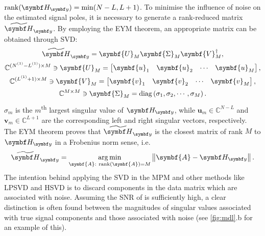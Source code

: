 $\rank(\Hy) = \min(N - L, L + 1)$. To minimise the influence of noise on
the estimated signal poles, it is necessary to
generate a rank-reduced matrix $\Hytilde$. By employing the \ac{EYM}
theorem\cite[Section~2.2]{Golub2013}, an appropriate matrix can be obtained
through \ac{SVD}:%
\begin{subequations}%
    \begin{gather}%
    \Hytilde =
        \symbf{U}_M^{\vphantom{\dagger}}
        \symbf{\Sigma}_M^{\vphantom{\dagger}}
        \symbf{V}_M^{\dagger},\\
    \mathbb{C}^{(\None - \Lone) \times M} \ni
        \symbf{U}_M^{\vphantom{\dagger}} =
        \begin{bmatrix}
            \symbf{u}_1 &
            \symbf{u}_2 &
            \cdots &
            \symbf{u}_M
        \end{bmatrix},\\
    \mathbb{C}^{(\Lone + 1) \times M} \ni
        \symbf{V}_M^{\vphantom{\dagger}} =
        \begin{bmatrix}
            \symbf{v}_1 &
            \symbf{v}_2 &
            \cdots &
            \symbf{v}_M
        \end{bmatrix},\\
    \mathbb{C}^{M \times M} \ni
        \symbf{\Sigma}_M^{\vphantom{\dagger}} =
        \diag \left( \sigma_1, \sigma_2, \cdots, \sigma_M \right).
    \end{gather}
\end{subequations}
$\sigma_m$ is the $m$\textsuperscript{th} largest singular value of $\Hy$,
while $\symbf{u}_m \in \mathbb{C}^{N - L}$ and $\symbf{v}_m \in
\mathbb{C}^{L+1}$ are the corresponding left and right singular vectors,
respectively. The \ac{EYM} theorem proves that $\Hytilde$ is the closest matrix
of rank $M$ to $\Hy$ in a Frobenius norm sense, i.e.
\begin{equation}
    \Hytilde = \argmin_{\symbf{A}:\ \rank(\symbf{A}) = M} \left \lVert \symbf{A} - \Hy \right \rVert.
\end{equation}
The intention behind applying the \ac{SVD} in the \ac{MPM} and other
methods like \ac{LPSVD} and \ac{HSVD} is to discard components in the data
matrix which are associated with noise. Assuming the \ac{SNR} of  is
sufficiently high, a clear distinction is often found between the magnitudes of
singular values associated with true signal components and those associated
with noise (see \cref{fig:mdl}.b for an example of this).

